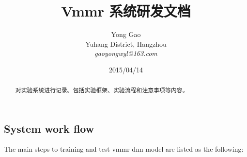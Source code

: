 \documentclass{article}
\begin{document}
\begin{CJK}{UTF8}{gbsn}


\title{Vmmr 系统研发文档}
\author{Yong Gao\\
       Yuhang District, Hangzhou\\
       \emph{gaoyongwyl@163.com}}
\date{2015/04/14}
\maketitle


\begin{abstract}
 对实验系统进行记录。包括实验框架、实验流程和注意事项等内容。
\end{abstract}


\section{System work flow}
\label{sec:introduction}
The main steps to training and test vmmr dnn model are listed as the following:
 

\end{CJK}
\end{document}
